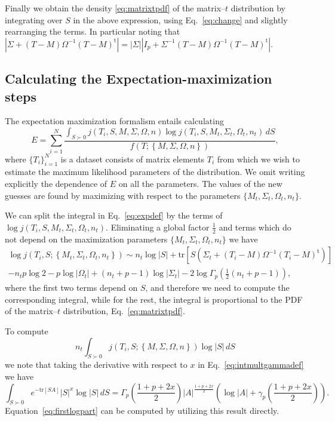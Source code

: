 \documentclass[english,listof=totoc]{scrartcl}
\begin{document}
Finally we obtain the density \eqref{eq:matrixtpdf} of the matrix--$t$ distribution
by integrating over $S$ in the above expression, using Eq.~\eqref{eq:change} and slightly
rearranging the terms. In particular noting that
$|\Sigma+(T-M)\Omega^{-1}(T-M)^{\textrm{t}}|=|\Sigma||I_p+\Sigma^{-1}(T-M)\Omega^{-1}(T-M)^{\textrm{t}}|$.

\subsection{Calculating the Expectation-maximization steps}

The expectation maximization formalism entails calculating 
\begin{equation}
E=\sum_{i=1}^{N}\frac{\int_{S\succ 0}j(T_{i},S,M,\Sigma,\Omega,n)\log j(T_{i},S,M_{t},\Sigma_{t},\Omega_{t},n_{t})\,dS}{f(T;\left\{M,\Sigma,\Omega,n\right\})},\label{eq:expdef}
\end{equation}
where $\{T_i\}_{i=1}^N$ is a dataset consists of matrix elements $T_i$ from which we wish to estimate the maximum likelihood parameters of the distribution. We omit writing explicitly the dependence of $E$ on all the parameters. The values of the new guesses are found by maximizing with respect to the parameters $\{M_{t},\Sigma_{t},\Omega_{t},n_{t}\}$.

We can split the integral in Eq.~\eqref{eq:expdef} by the terms of $\log j(T_{i},S,M_{t},\Sigma_{t},\Omega_{t},n_{t})$. Eliminating a global factor $\frac{1}{2}$ and terms which do not depend on the
maximization parameters $\{M_{t},\Sigma_{t},\Omega_{t},n_{t}\}$ we have
\begin{equation}
\begin{split}\log j(T_{i},S;\left\{M_{t},\Sigma_{t},\Omega_{t},n_{t}\right\})\sim n_{t}\log|S|+\textrm{tr}\left[S(\Sigma_{t}+(T_{i}-M)\Omega^{-1}(T_{i}-M)^{\textrm{t}})\right]\\
-n_{t}p\log2-p\log |\Omega_{t}|+(n_{t}+p-1)\log |\Sigma_{t}|-2\log\Gamma_{p}(\frac{1}{2}(n_{t}+p-1)),
\end{split}
\end{equation}
where the first two terms depend on $S$, and therefore we need to compute the corresponding integral, while for the rest, the integral is proportional to the PDF of the matrix--$t$ distribution, Eq.~\eqref{eq:matrixtpdf}.

To compute
\begin{equation}
n_{t}\int_{S\succ 0}j(T_{i},S;\left\{M,\Sigma,\Omega,n\right\})\log |S|\,dS\label{eq:firstlogpart}
\end{equation}
we note that taking the derivative with respect to $x$ in Eq.~\eqref{eq:intmultgammadef} we have
\begin{equation}
\int_{S\succ 0}e^{-\textrm{tr}\left[SA\right]}|S|^{x}\log |S|\,dS=\Gamma_{p}\left(\frac{1+p+2x}{2}\right)|A|^{\frac{1+p+2x}{2}}(\log |A|+\gamma_{p}\left(\frac{1+p+2x}{2}\right)).\label{eq:intderivative}
\end{equation}
Equation~\eqref{eq:firstlogpart} can be computed by utilizing this result directly.
\end{document}
